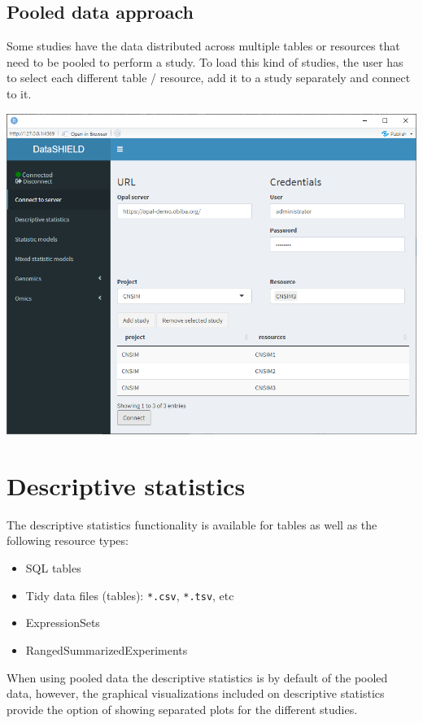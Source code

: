 \documentclass[
]{book}
\providecommand{\tightlist}{%
  \setlength{\itemsep}{0pt}\setlength{\parskip}{0pt}}
\begin{document}
\hypertarget{pooled-data-approach}{%
\subsection{Pooled data approach}\label{pooled-data-approach}}

Some studies have the data distributed across multiple tables or resources that need to be pooled to perform a study. To load this kind of studies, the user has to select each different table / resource, add it to a study separately and connect to it.

\includegraphics{images/data_entry3.png}

\hypertarget{descriptive-statistics}{%
\section{Descriptive statistics}\label{descriptive-statistics}}

The descriptive statistics functionality is available for tables as well as the following resource types:

\begin{itemize}
\tightlist
\item
  SQL tables
\item
  Tidy data files (tables): \texttt{*.csv}, \texttt{*.tsv}, etc
\item
  ExpressionSets
\item
  RangedSummarizedExperiments
\end{itemize}

When using pooled data the descriptive statistics is by default of the pooled data, however, the graphical visualizations included on descriptive statistics provide the option of showing separated plots for the different studies.
\end{document}
